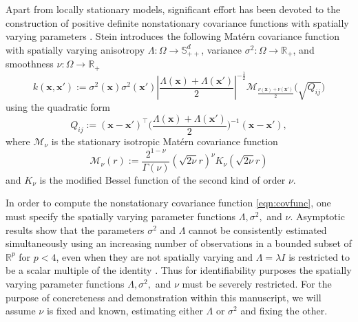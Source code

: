 \documentclass{article}
\newcommand{\abs}[1]{\left|#1\right|}
\newcommand{\R}{\mathbb{R}}
\numberwithin{equation}{section}
\newcommand{\x}{\bm{x}}
\newcommand{\xp}{\bm{x'}}
\begin{document}
Apart from locally stationary models, significant effort has been devoted to the construction of positive definite nonstationary covariance functions with spatially varying parameters \cite{gibbs1997bayesian, paciorek2003nonstationary}. Stein \cite{stein2005nonstationary} introduces the following Mat\'ern covariance function with spatially varying anisotropy $\Lambda : \Omega \to \mathbb{S}^d_{++}$, variance $\sigma^2 : \Omega \to \R_+$, and smoothness $\nu : \Omega \to \R_+$
\begin{equation}
  k(\x, \xp) := \sigma^2(\x) \sigma^2(\xp) \abs{\frac{\Lambda(\x) + \Lambda(\xp)}{2}}^{-\frac{1}{2}}
  \mathcal{M}_{\frac{\nu(\x) + \nu(\xp)}{2}} \bigg( \sqrt{Q_{ij}} \bigg)
  \label{eqn:covfunc}
\end{equation}
using the quadratic form
\begin{equation*}
  Q_{ij} := (\x - \xp)^\top \Big(\frac{\Lambda(\x) + \Lambda(\xp)}{2}\Big)^{-1} (\x - \xp),
\end{equation*}
where $\mathcal{M}_\nu$ is the stationary isotropic Mat\'ern covariance function
$$ \mathcal{M}_\nu(r) := \frac{2^{1-\nu}}{\Gamma(\nu)} (\sqrt{2\nu} r)^\nu K_\nu(\sqrt{2\nu} r) $$
and $K_\nu$ is the modified Bessel function of the second kind of order $\nu$.

In order to compute the nonstationary covariance function \ref{eqn:covfunc}, one must specify the spatially varying parameter functions $\Lambda, \sigma^2,$ and $\nu$. Asymptotic results show that the parameters $\sigma^2$ and $\Lambda$ cannot be consistently estimated simultaneously using an increasing number of observations in a bounded subset of $\R^p$ for $p<4$, even when they are not spatially varying and $\Lambda = \lambda I$ is restricted to be a scalar multiple of the identity \cite{zhang2004inconsistent}.
Thus for identifiability purposes the spatially varying parameter functions $\Lambda, \sigma^2,$ and $\nu$ must be severely restricted. For the purpose of concreteness and demonstration within this manuscript, we will assume $\nu$ is fixed and known, estimating either $\Lambda$ or $\sigma^2$ and fixing the other.
\end{document}

